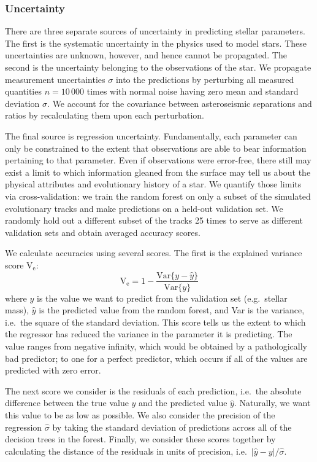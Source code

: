 \documentclass[twocolumn,twocolappendix]{aastex6}
\newcommand\abs[1]{\left|#1\right|}
\begin{document}
\subsubsection{Uncertainty}
\label{sec:uncertainties}
There are three separate sources of uncertainty in predicting stellar parameters. The first is the systematic uncertainty in the physics used to model stars. These uncertainties are unknown, however, and hence cannot be propagated. The second is the uncertainty belonging to the observations of the star. We propagate measurement uncertainties $\sigma$ into the predictions by perturbing all measured quantities $n=10\,000$ times with normal noise having zero mean and standard deviation $\sigma$. We account for the covariance between asteroseismic separations and ratios by recalculating them upon each perturbation. 

The final source is regression uncertainty. Fundamentally, each parameter can only be constrained to the extent that observations are able to bear information pertaining to that parameter. Even if observations were error-free, there still may exist a limit to which information gleaned from the surface may tell us about the physical attributes and evolutionary history of a star. We quantify those limits via cross-validation: we train the random forest on only a subset of the simulated evolutionary tracks and make predictions on a held-out validation set. We randomly hold out a different subset of the tracks 25 times to serve as different validation sets and obtain averaged accuracy scores.

We calculate accuracies using several scores. The first is the explained variance score V$_{\text{e}}$:
\begin{equation}
  \text{V}_{\text{e}} = 1 - \frac{\text{Var}\{ y - \hat y \}}{\text{Var}\{ y \}}
\end{equation}
where $y$ is the value we want to predict from the validation set (e.g.\ stellar mass), $\hat y$ is the predicted value from the random forest, and Var is the variance, i.e.\ the square of the standard deviation. This score tells us the extent to which the regressor has reduced the variance in the parameter it is predicting. The value ranges from negative infinity, which would be obtained by a pathologically bad predictor; to one for a perfect predictor, which occurs if all of the values are predicted with zero error. 

The next score we consider is the residuals of each prediction, i.e.\ the absolute difference between the true value $y$ and the predicted value $\hat y$. Naturally, we want this value to be as low as possible. We also consider the precision of the regression $\hat \sigma$ by taking the standard deviation of predictions across all of the decision trees in the forest. Finally, we consider these scores together by calculating the distance of the residuals in units of precision, i.e.\ $\abs{\hat y - y} / \hat{\sigma}$. 
\end{document}
